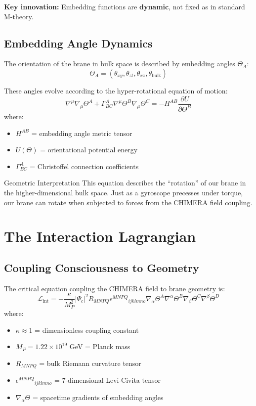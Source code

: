 \textbf{Key innovation:} Embedding functions are \textbf{dynamic}, not fixed as in standard M-theory.

\subsection{Embedding Angle Dynamics}

The orientation of the brane in bulk space is described by embedding angles $\Theta_A$:
\begin{equation}
\Theta_A = (\theta_{xy}, \theta_{zt}, \theta_{xz}, \theta_{\text{bulk}})
\end{equation}

These angles evolve according to the hyper-rotational equation of motion:
\begin{equation}
\nabla^\mu\nabla_\mu\Theta^A + \Gamma^A_{BC}\nabla^\mu\Theta^B\nabla_\mu\Theta^C = -H^{AB}\frac{\partial U}{\partial\Theta^B}
\end{equation}
where:
\begin{itemize}
\item $H^{AB}$ = embedding angle metric tensor
\item $U(\Theta)$ = orientational potential energy
\item $\Gamma^A_{BC}$ = Christoffel connection coefficients
\end{itemize}

\begin{calloutbox}{Geometric Interpretation}
This equation describes the ``rotation'' of our brane in the higher-dimensional bulk space. Just as a gyroscope precesses under torque, our brane can rotate when subjected to forces from the CHIMERA field coupling.
\end{calloutbox}

\section{The Interaction Lagrangian}

\subsection{Coupling Consciousness to Geometry}

The critical equation coupling the CHIMERA field to brane geometry is:
\begin{equation}
\mathcal{L}_{\text{int}} = -\frac{\kappa}{M_P^2}|\Psi_c|^2 R_{MNPQ}\epsilon^{MNPQ}{}_{ijklmno}\nabla_\alpha\Theta^A\nabla^\alpha\Theta^B\nabla_\beta\Theta^C\nabla^\beta\Theta^D
\end{equation}
where:
\begin{itemize}
\item $\kappa \approx 1$ = dimensionless coupling constant
\item $M_P = 1.22 \times 10^{19}$ GeV = Planck mass
\item $R_{MNPQ}$ = bulk Riemann curvature tensor
\item $\epsilon^{MNPQ}{}_{ijklmno}$ = 7-dimensional Levi-Civita tensor
\item $\nabla_\alpha\Theta$ = spacetime gradients of embedding angles
\end{itemize}

